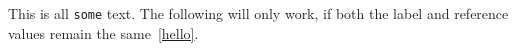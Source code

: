 This is all \texttt{some} text.
\label{hello}
The following will only work, if both the label and reference values remain the same~\ref{hello}.